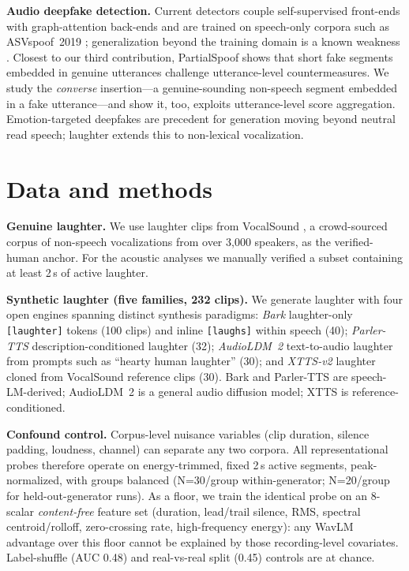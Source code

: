 \documentclass[sigconf,anonymous,review]{acmart}
\begin{document}
\textbf{Audio deepfake detection.} Current detectors couple self-supervised front-ends with graph-attention back-ends \cite{tak2022automatic,jung2022aasist} and are trained on speech-only corpora such as ASVspoof~2019 \cite{wang2020asvspoof}; generalization beyond the training domain is a known weakness \cite{muller2022does}. Closest to our third contribution, PartialSpoof \cite{zhang2023partialspoof} shows that short fake segments embedded in genuine utterances challenge utterance-level countermeasures. We study the \emph{converse} insertion---a genuine-sounding non-speech segment embedded in a fake utterance---and show it, too, exploits utterance-level score aggregation. Emotion-targeted deepfakes \cite{zhao2022emofake} are precedent for generation moving beyond neutral read speech; laughter extends this to non-lexical vocalization.

\section{Data and methods}
\label{sec:methods}

\textbf{Genuine laughter.} We use laughter clips from VocalSound \cite{gong2022vocalsound}, a crowd-sourced corpus of non-speech vocalizations from over 3{,}000 speakers, as the verified-human anchor. For the acoustic analyses we manually verified a subset containing at least 2\,s of active laughter.

\textbf{Synthetic laughter (five families, 232 clips).} We generate laughter with four open engines spanning distinct synthesis paradigms: \emph{Bark} \cite{bark2023} laughter-only \texttt{[laughter]} tokens (100 clips) and inline \texttt{[laughs]} within speech (40); \emph{Parler-TTS} \cite{lyth2024parler} description-conditioned laughter (32); \emph{AudioLDM~2} \cite{liu2024audioldm2} text-to-audio laughter from prompts such as ``hearty human laughter'' (30); and \emph{XTTS-v2} \cite{casanova2024xtts} laughter cloned from VocalSound reference clips (30). Bark and Parler-TTS are speech-LM-derived; AudioLDM~2 is a general audio diffusion model; XTTS is reference-conditioned.

\textbf{Confound control.} Corpus-level nuisance variables (clip duration, silence padding, loudness, channel) can separate any two corpora. All representational probes therefore operate on energy-trimmed, fixed 2\,s active segments, peak-normalized, with groups balanced (N=30/group within-generator; N=20/group for held-out-generator runs). As a floor, we train the identical probe on an 8-scalar \emph{content-free} feature set (duration, lead/trail silence, RMS, spectral centroid/rolloff, zero-crossing rate, high-frequency energy): any WavLM advantage over this floor cannot be explained by those recording-level covariates. Label-shuffle (AUC 0.48) and real-vs-real split (0.45) controls are at chance.
\end{document}
